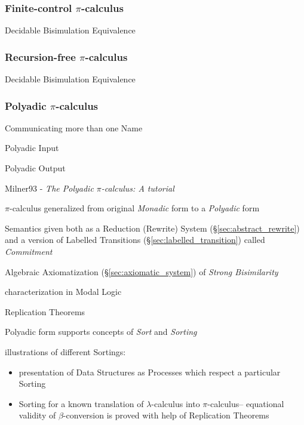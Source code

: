 \subsubsection{Finite-control $\pi$-calculus}
\label{sec:finitecontrol_pi_calculus}

Decidable Bisimulation Equivalence



\subsubsection{Recursion-free $\pi$-calculus}
\label{sec:recursionfree_pi_calculus}

Decidable Bisimulation Equivalence



\subsubsection{Polyadic $\pi$-calculus}\label{sec:polyadic_pi_calculus}

Communicating more than one Name

Polyadic Input

Polyadic Output

Milner93 - \emph{The Polyadic $\pi$-calculus: A tutorial}

$\pi$-calculus generalized from original \emph{Monadic} form to a
\emph{Polyadic} form

Semantics given both as a Reduction (Rewrite) System
(\S\ref{sec:abstract_rewrite}) and a version of Labelled Transitions
(\S\ref{sec:labelled_transition}) called \emph{Commitment}

Algebraic Axiomatization (\S\ref{sec:axiomatic_system}) of
\emph{Strong Bisimilarity}

characterization in Modal Logic

Replication Theorems

Polyadic form supports concepts of \emph{Sort} and \emph{Sorting}

illustrations of different Sortings:
\begin{itemize}
  \item presentation of Data Structures as Processes which respect a particular
    Sorting
  \item Sorting for a known translation of $\lambda$-calculus into
    $\pi$-calculus-- equational validity of $\beta$-conversion is proved with
    help of Replication Theorems
\end{itemize}

